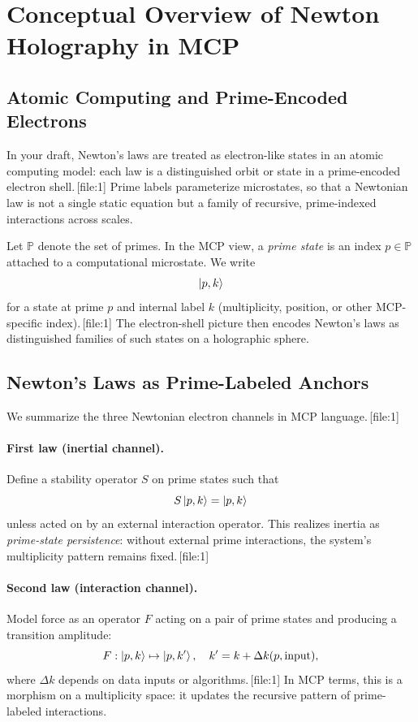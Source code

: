 \documentclass[11pt]{article}
\begin{document}
\section{Conceptual Overview of Newton Holography in MCP}

\subsection{Atomic Computing and Prime-Encoded Electrons}

In your draft, Newton's laws are treated as electron-like states in an
atomic computing model: each law is a distinguished orbit or state in a
prime-encoded electron shell.\,[file:1]
Prime labels parameterize microstates, so that a Newtonian law is not a
single static equation but a family of recursive, prime-indexed
interactions across scales.

Let $\mathbb{P}$ denote the set of primes.
In the MCP view, a \emph{prime state} is an index $p\in\mathbb{P}$
attached to a computational microstate.
We write
\[
  \ket{p,k}
\]
for a state at prime $p$ and internal label $k$ (multiplicity,
position, or other MCP-specific index).\,[file:1]
The electron-shell picture then encodes Newton's laws as distinguished
families of such states on a holographic sphere.

\subsection{Newton's Laws as Prime-Labeled Anchors}

We summarize the three Newtonian electron channels in MCP language.\,[file:1]

\paragraph{First law (inertial channel).}
Define a stability operator $S$ on prime states such that
\[
  S\ket{p,k} = \ket{p,k}
\]
unless acted on by an external interaction operator.
This realizes inertia as \emph{prime-state persistence}:
without external prime interactions, the system's multiplicity pattern
remains fixed.\,[file:1]

\paragraph{Second law (interaction channel).}
Model force as an operator $F$ acting on a pair of prime states and
producing a transition amplitude:
\[
  F: \ket{p,k} \mapsto \ket{p,k'} , \quad
  k' = k + \Delta k(p, \mathrm{input}),
\]
where $\Delta k$ depends on data inputs or algorithms.\,[file:1]
In MCP terms, this is a morphism on a multiplicity space:
it updates the recursive pattern of prime-labeled interactions.
\end{document}
